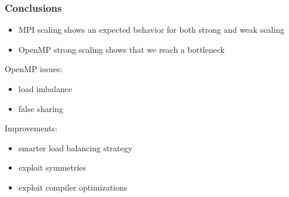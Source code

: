 \documentclass{beamer}
\begin{document}
\begin{frame}
    \frametitle{Conclusions}
    \begin{itemize}
        \item MPI scaling shows an expected behavior for both strong and weak scaling
        \item OpenMP strong scaling shows that we reach a bottleneck
    \end{itemize}
     
    OpenMP issues:
    \begin{itemize}
        \item load imbalance
        \item false sharing
    \end{itemize}

    Improvements:
    \begin{itemize}
        \item smarter load balancing strategy
        \item exploit symmetries
        \item exploit compiler optimizations
    \end{itemize}

\end{frame}
\end{document}
